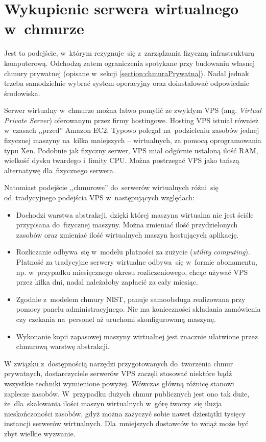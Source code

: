 \documentclass[12pt,a4paper,twoside,titlepage,openright]{book}
\begin{document}
\section{Wykupienie serwera wirtualnego w~chmurze}\label{section:podejscieVm}

Jest to podejście, w~którym rezygnuje~się z~zarządzania fizyczną infrastrukturą komputerową. Odchodzą zatem ograniczenia spotykane przy budowaniu własnej chmury prywatnej (opisane w~sekcji  \ref{section:chmuraPrywatna}). Nadal jednak trzeba samodzielnie wybrać system operacyjny oraz doinstalować odpowiednie środowiska.

Serwer wirtualny w~chmurze można łatwo pomylić ze zwykłym VPS (ang. \textit{Virtual Private Server}) oferowanym przez firmy hostingowe. Hosting VPS istniał również w~czasach ,,przed'' Amazon EC2. Typowo polegał na~podzieleniu zasobów jednej fizycznej maszyny na~kilka mniejszych -- wirtualnych, za pomocą oprogramowania typu Xen. Podobnie jak fizyczny serwer, VPS miał odgórnie ustaloną ilość RAM, wielkość dysku twardego i~limity CPU. Można postrzegać VPS jako tańszą alternatywę dla~fizycznego serwera. 

Natomiast podejście ,,chmurowe'' do~serwerów wirtualnych różni~się od~tradycyjnego podejścia VPS w~następujących względach:
\begin{itemize}
\item Dochodzi warstwa abstrakcji, dzięki której maszyna wirtualna nie jest ściśle przypisana do~fizycznej maszyny. Można zmieniać ilość przydzielonych zasobów oraz zmieniać ilość wirtualnych maszyn hostujących aplikację.
\item Rozliczanie odbywa~się w~modelu płatności za zużycie (\textit{utility computing}). Płatność za tradycyjne serwery wirtualne odbywa~się w~formie abonamentu, np. w~przypadku miesięcznego okresu rozliczeniowego, chcąc używać VPS przez kilka dni, nadal należałoby zapłacić za cały miesiąc.
\item Zgodnie z~modelem chmury NIST, panuje samoobsługa realizowana przy pomocy panelu administracyjnego. Nie ma konieczności składania zamówienia czy czekania na~personel aż uruchomi skonfigurowaną maszynę.
\item Wykonanie kopii zapasowej maszyny wirtualnej jest znacznie ułatwione przez chmurową warstwę abstrakcji. 
\end{itemize}

W związku z~dostępnością narzędzi przygotowanych do~tworzenia chmur prywatnych, dostarczyciele serwerów VPS zaczęli stosować niektóre bądź wszystkie techniki wymienione powyżej. Wówczas główną różnicę stanowi zaplecze zasobów. W~przypadku dużych chmur publicznych jest ono tak duże, że~dla~skalowania ilości maszyn wirtualnych w~górę tworzy~się iluzja nieskończoności zasobów, gdyż można zażyczyć sobie nawet dziesiątki tysięcy instancji serwerów wirtualnych. Dla~mniejszych dostawców to wciąż może być zbyt wielkie wyzwanie.
\end{document}

